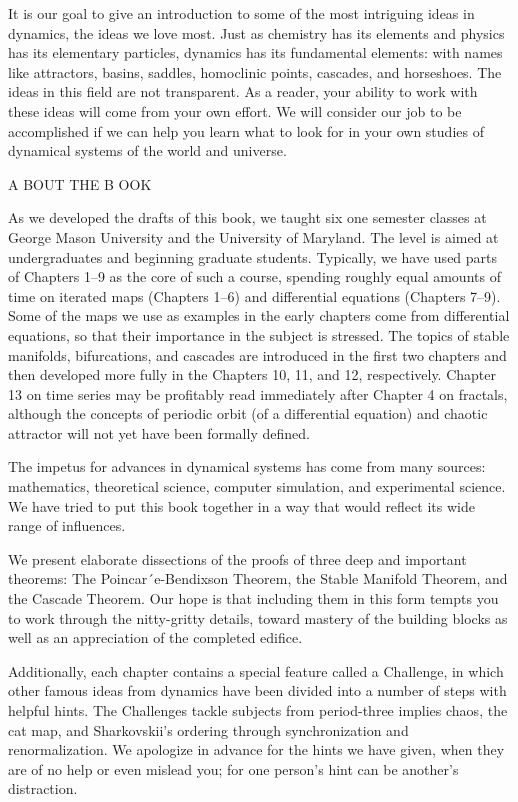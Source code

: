 It is our goal to give an introduction to some of the most intriguing ideas in dynamics, the ideas we love 
most. Just as chemistry has its elements and physics has its elementary particles, dynamics has its 
fundamental elements: with names like attractors, basins, saddles, homoclinic points, cascades, and 
horseshoes. The ideas in this ﬁeld are not transparent. As a reader, your ability to work with these ideas 
will come from your own effort. We will consider our job to be accomplished if we can help you learn what 
to look for in your own studies of dynamical systems of the world and universe.

A BOUT THE B OOK

As we developed the drafts of this book, we taught six one semester classes at George Mason University and 
the University of Maryland. The level is aimed at undergraduates and beginning graduate students. 
Typically, we have used parts of Chapters 1–9 as the core of such a course, spending roughly equal amounts 
of time on iterated maps (Chapters 1–6) and differential equations (Chapters 7–9). Some of the maps we use 
as examples in the early chapters come from differential equations, so that their importance in the subject 
is stressed. The topics of stable manifolds, bifurcations, and cascades are introduced in the ﬁrst two 
chapters and then developed more fully in the Chapters 10, 11, and 12, respectively. Chapter 13 on time 
series may be proﬁtably read immediately after Chapter 4 on fractals, although the concepts of periodic 
orbit (of a differential equation) and chaotic attractor will not yet have been formally deﬁned.

The impetus for advances in dynamical systems has come from many sources: mathematics, theoretical science, 
computer simulation, and experimental science. We have tried to put this book together in a way that would reﬂect its wide range of 
inﬂuences.

We present elaborate dissections of the proofs of three deep and important theorems: The 
Poincar´e-Bendixson Theorem, the Stable Manifold Theorem, and the Cascade Theorem. Our hope is that 
including them in this form tempts you to work through the nitty-gritty details, toward mastery of the 
building blocks as well as an appreciation of the completed ediﬁce.

Additionally, each chapter contains a special feature called a Challenge, in which other famous ideas from 
dynamics have been divided into a number of steps with helpful hints. The Challenges tackle subjects from 
period-three implies chaos, the cat map, and Sharkovskii’s ordering through synchronization and 
renormalization. We apologize in advance for the hints we have given, when they are of no help or even 
mislead you; for one person’s hint can be another’s distraction.

